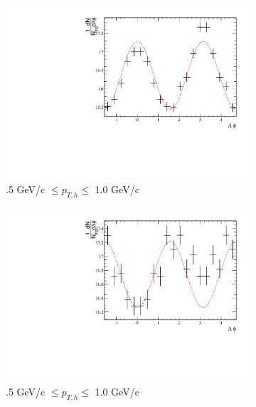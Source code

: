 \begin{figure}[htbp]
	\begin{subfigure}{0.5\textwidth}
		\includegraphics[width=\textwidth]{Plots/Correlations/EP/raw/NPE_eh_corr_raw_inplane_primpt_4_5_cent_2_5_assopt_1_1.pdf}
		\caption{.5 GeV/c $\leq p_{T,h} \leq$ 1.0 GeV/c}
		\label{fig:EP_corr_raw_a}
	\end{subfigure}	
	\begin{subfigure}{0.5\textwidth}
		\includegraphics[width=\textwidth]{Plots/Correlations/EP/raw/NPE_eh_corr_raw_outofplane_primpt_4_5_cent_2_5_assopt_1_1.pdf}
		\caption{.5 GeV/c $\leq p_{T,h} \leq$ 1.0 GeV/c}
		\label{fig:EP_corr_raw_b}
	\end{subfigure}	
	\begin{subfigure}{0.5\textwidth}

\end{subfigure}
\end{figure}

